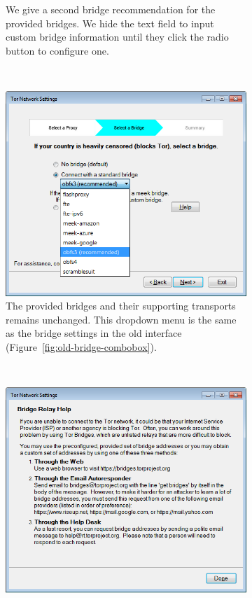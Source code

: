 \documentclass[USenglish,oneside,twocolumn]{article}
\begin{document}
\begin{figure}
\begin{subfigure}[b]{0.30\textwidth}
	\centering\captionsetup{width=1.5\linewidth}%
	\caption{We give a second bridge recommendation for the provided bridges. We hide the text field to input custom bridge information until they click the radio button to configure one.}
	\label{fig:new-bridge}
\end{subfigure}
~~~~~~~~~~
\begin{subfigure}[b]{0.30\textwidth}
	\includegraphics[width=\textwidth]{screenshots/NEW-bridgeSettings-combobox.png}
	\centering\captionsetup{width=1.5\linewidth}%
	\caption{The provided bridges and their supporting transports remains unchanged. This dropdown menu is the same as the bridge settings in the old interface (Figure~\ref{fig:old-bridge-combobox}).}
	\label{fig:new-bridge-combobox}
\end{subfigure}
~~~~~~~~~~~~~~~~~~~~~~~~~
\begin{subfigure}[b]{0.30\textwidth}
	\includegraphics[width=\textwidth]{screenshots/NEW-bridgeHelp.png}

\end{subfigure}
\end{figure}
\end{document}
